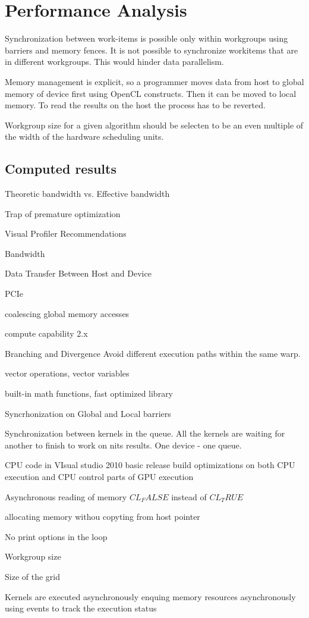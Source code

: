 \chapter{Performance Analysis}

Synchronization between work-items is possible only within workgroups using barriers and memory fences. It is not possible to synchronize workitems that are in different workgroups. This would hinder data parallelism.

Memory management is explicit, so a programmer moves data from host to global memory of device first using OpenCL constructs. Then it can be moved to local memory. To read the results on the host the process has to be reverted.

Workgroup size for a given algorithm should be selecten to be an even multiple of the width of the hardware scheduling units.

\section{Computed results}
Theoretic bandwidth vs. Effective bandwidth

Trap of premature optimization

Visual Profiler Recommendations

Bandwidth

Data Transfer Between Host and Device

PCIe

coalescing global memory accesses

compute capability 2.x

Branching and Divergence
Avoid different execution paths within the same warp.

vector operations, vector variables

built-in math functions, fast optimized library

Syncrhonization on Global and Local barriers

Synchronization between kernels in the queue. All the kernels are waiting for another to finish to work on nits results.
One device - one queue.

CPU code in VIsual studio 2010 basic release build optimizations on both CPU execution and CPU control parts of GPU execution

Asynchronous reading of memory $CL_FALSE$ instead of $CL_TRUE$

allocating memory withou copyting from host pointer

No print options in the loop

Workgroup size

Size of the grid

Kernels are executed asynchronously
enquing memory resources asynchronously
using events to track the execution status

